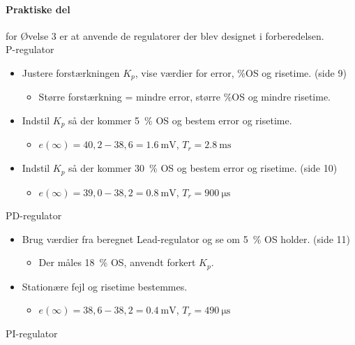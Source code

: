 \documentclass[danish]{article}
\begin{document}
\paragraph{Praktiske del} for Øvelse 3 er at anvende de regulatorer der blev designet i forberedelsen.\\
P-regulator
\begin{itemize}
	\item Justere forstærkningen $K_p$, vise værdier for error, $\si{\percent}$OS og risetime. (side 9)
	\begin{itemize}
		\item Større forstærkning = mindre error, større $\si{\percent}$OS og mindre risetime.
	\end{itemize}
	\item Indstil $K_p$ så der kommer \SI{5}{\percent} OS og bestem error og risetime. 
	\begin{itemize}
		\item $e(\infty) = 40,2-38,6 = \SI{1,6}{\milli\volt}$, $T_r = \SI{2,8}{\milli\second}$
	\end{itemize}
	\item Indstil $K_p$ så der kommer \SI{30}{\percent} OS og bestem error og risetime. (side 10)
	\begin{itemize}
		\item $e(\infty) = 39,0-38,2 = \SI{0,8}{\milli\volt}$, $T_r = \SI{900}{\micro\second}$
	\end{itemize}
\end{itemize}
\vspace{3mm}
PD-regulator
\begin{itemize}
	\item Brug værdier fra beregnet Lead-regulator og se om \SI{5}{\percent} OS holder. (side 11)
	\begin{itemize}
		\item Der måles \SI{18}{\percent} OS, anvendt forkert $K_p$.
	\end{itemize}
	\item Stationære fejl og risetime bestemmes. 
	\begin{itemize}
		\item $e(\infty) = 38,6-38,2 = \SI{0,4}{\milli\volt}$, $T_r = \SI{490}{\micro\second}$
	\end{itemize}
\end{itemize}
\vspace{3mm}
PI-regulator
\end{document}
